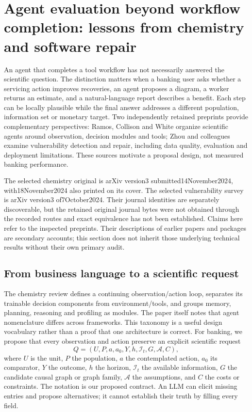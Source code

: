 \section[Agent evaluation beyond workflow completion]{Agent evaluation beyond workflow completion: lessons from chemistry and software repair}
\label{sec:exec25-cow}

An agent that completes a tool workflow has not necessarily answered the scientific question. The distinction matters when a banking user asks whether a servicing action improves recoveries, an agent proposes a diagram, a worker returns an estimate, and a natural-language report describes a benefit. Each step can be locally plausible while the final answer addresses a different population, information set or monetary target. Two independently retained preprints provide complementary perspectives: Ramos, Collison and White organize scientific agents around observation, decision modules and tools; Zhou and colleagues examine vulnerability detection and repair, including data quality, evaluation and deployment limitations. These sources motivate a proposal design, not measured banking performance.\citep{exec25_cow_chemistry,exec25_cow_vulnerability}

The selected chemistry original is arXiv version3 submitted14November2024, with18November2024 also printed on its cover. The selected vulnerability survey is arXiv version3 of7October2024. Their journal identities are separately discoverable, but the retained original journal bytes were not obtained through the recorded routes and exact equivalence has not been established. Claims here refer to the inspected preprints. Their descriptions of earlier papers and packages are secondary accounts; this section does not inherit those underlying technical results without their own primary audit.\citep{exec25_cow_chemistry,exec25_cow_vulnerability}

\subsection{From business language to a scientific request}

The chemistry review defines a continuing observation/action loop, separates its trainable decision components from environment/tools, and groups memory, planning, reasoning and profiling as modules. The paper itself notes that agent nomenclature differs across frameworks. This taxonomy is a useful design vocabulary rather than a proof that one architecture is correct. For banking, we propose that every observation and action preserve an explicit scientific request
\[
 Q=(U,P,a,a_0,Y,h,\mathcal I_t,G,\mathcal A,C),
\]
where $U$ is the unit, $P$ the population, $a$ the contemplated action, $a_0$ its comparator, $Y$ the outcome, $h$ the horizon, $\mathcal I_t$ the available information, $G$ the candidate causal graph or graph family, $\mathcal A$ the assumptions, and $C$ the costs or constraints. The notation is our proposed contract. An LLM can elicit missing entries and propose alternatives; it cannot establish their truth by filling every field.\citep{exec25_cow_chemistry,exec25_cow_reference}

